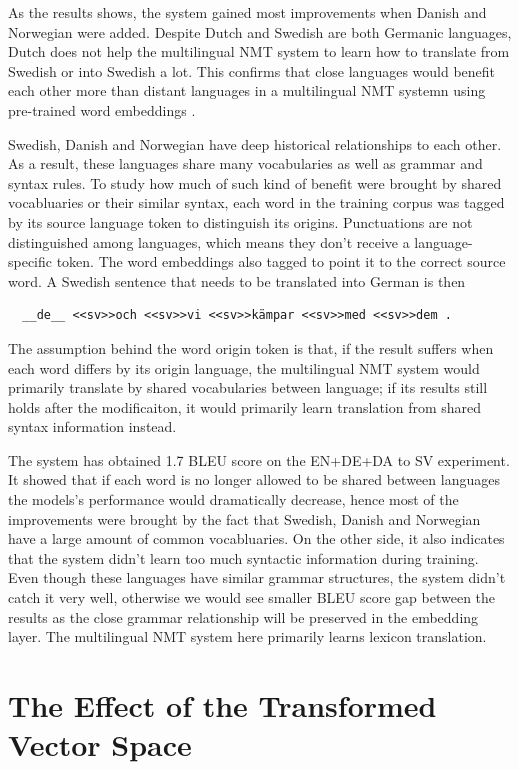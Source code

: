 \documentclass[thesis,fonts=libertine]{cluu}
\begin{document}
As the results shows, the system gained most improvements when Danish and Norwegian were added. Despite Dutch and Swedish are both Germanic languages, Dutch does not help the multilingual NMT system to learn how to translate from Swedish or into Swedish a lot. This confirms that close languages would benefit each other more than distant languages in a multilingual NMT systemn using pre-trained word embeddings \parencite{Qi:2018aa}.

Swedish, Danish and Norwegian have deep historical relationships to each other. As a result, these languages share many vocabularies as well as grammar and syntax rules. To study how much of such kind of benefit were brought by shared vocabluaries or their similar syntax, each word in the training corpus was tagged by its source language token to distinguish its origins. Punctuations are not distinguished among languages, which means they don't receive a language-specific token. The word embeddings also tagged to point it to the correct source word. A Swedish sentence that needs to be translated into German is then 

\begin{verbatim}
  __de__ <<sv>>och <<sv>>vi <<sv>>kämpar <<sv>>med <<sv>>dem .
\end{verbatim}

The assumption behind the word origin token is that, if the result suffers when each word differs by its origin language, the multilingual NMT system would primarily translate by shared vocabularies between language; if its results still holds after the modificaiton, it would primarily learn translation from shared syntax information instead.

The system has obtained 1.7 BLEU score on the EN+DE+DA to SV experiment. It showed that if each word is no longer allowed to be shared between languages the models's performance would dramatically decrease, hence most of the improvements were brought by the fact that Swedish, Danish and Norwegian have a large amount of common vocabluaries. On the other side, it also indicates that the system didn't learn too much syntactic information during training. Even though these languages have similar grammar structures, the system didn't catch it very well, otherwise we would see smaller BLEU score gap between the results as the close grammar relationship will be preserved in the embedding layer. The multilingual NMT system here primarily learns lexicon translation.

\section{The Effect of the Transformed Vector Space}
\end{document}
